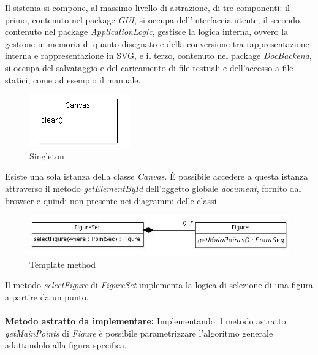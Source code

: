 Il sistema si compone, al massimo livello di astrazione, di tre componenti: il primo, contenuto nel package \textit{GUI}, si occupa dell'interfaccia utente, il secondo, contenuto nel package \textit{ApplicationLogic}, gestisce la logica interna, ovvero la gestione in memoria di quanto disegnato e della conversione tra rappresentazione interna e rappresentazione in SVG, e il terzo, contenuto nel package \textit{DocBackend}, si occupa del salvataggio e del caricamento di file testuali e dell'accesso a file statici, come ad esempio il manuale.
\newpage
{}

\begin{figure}[!ht]
\centering
\includegraphics{canvas.jpg}
\caption{Singleton}
\end{figure}
Esiste una sola istanza della classe \textit{Canvas}. \`E possibile accedere a 
questa istanza attraverso il metodo \textit{getElementById} dell'oggetto 
globale \textit{document}, fornito dal browser e quindi non presente nei 
diagrammi delle classi.

\begin{figure}[!ht]
\centering
\includegraphics{templatemethod.jpg}
\caption{Template method}
\end{figure}
Il metodo \textit{selectFigure} di \textit{FigureSet} implementa la logica di selezione di una figura a partire da un punto.\\ \\
\textbf{Metodo astratto da implementare:}
Implementando il metodo astratto \textit{getMainPoints} di \textit{Figure} \`e possibile parametrizzare l'algoritmo generale adattandolo alla figura specifica.

